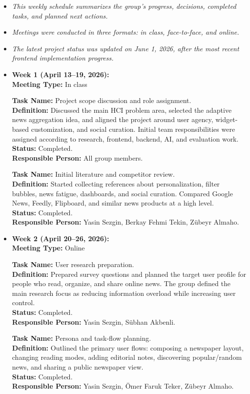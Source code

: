 \documentclass[12pt,a4paper]{article}
\newcommand{\taskentry}[4]{%
  \textbf{Task Name:} #1\\
  \textbf{Definition:} #2\\
  \textbf{Status:} #3\\
  \textbf{Responsible Person:} #4
}
\newcommand{\weekblock}[3]{%
  \item {\Large\bfseries #1}\\[-0.2em]
  \textbf{Meeting Type:} #2

  \vspace{0.25cm}
  \hspace*{0.8cm}
  \begin{minipage}[t]{0.86\textwidth}
    #3
  \end{minipage}
}
\begin{document}
\begin{itemize}[leftmargin=2.1cm, itemsep=0.4em]
    \item \textit{This weekly schedule summarizes the group's progress, decisions, completed tasks, and planned next actions.}
    \item \textit{Meetings were conducted in three formats: in class, face-to-face, and online.}
    \item \textit{The latest project status was updated on June 1, 2026, after the most recent frontend implementation progress.}
\end{itemize}

\vspace{0.4cm}

\begin{itemize}[leftmargin=1.1cm, itemsep=1.45cm]
    \weekblock{Week 1 (April 13--19, 2026):}{In class}{
      \taskentry
        {Project scope discussion and role assignment.}
        {Discussed the main HCI problem area, selected the adaptive news aggregation idea, and aligned the project around user agency, widget-based customization, and social curation. Initial team responsibilities were assigned according to research, frontend, backend, AI, and evaluation work.}
        {Completed.}
        {All group members.}

      \vspace{0.45cm}
      \taskentry
        {Initial literature and competitor review.}
        {Started collecting references about personalization, filter bubbles, news fatigue, dashboards, and social curation. Compared Google News, Feedly, Flipboard, and similar news products at a high level.}
        {Completed.}
        {Yasin Sezgin, Berkay Fehmi Tekin, Zübeyr Almaho.}
    }

    \weekblock{Week 2 (April 20--26, 2026):}{Online}{
      \taskentry
        {User research preparation.}
        {Prepared survey questions and planned the target user profile for people who read, organize, and share online news. The group defined the main research focus as reducing information overload while increasing user control.}
        {Completed.}
        {Yasin Sezgin, Sübhan Akbenli.}

      \vspace{0.45cm}
      \taskentry
        {Persona and task-flow planning.}
        {Outlined the primary user flows: composing a newspaper layout, changing reading modes, adding editorial notes, discovering popular/random news, and sharing a public newspaper view.}
        {Completed.}
        {Yasin Sezgin, Ömer Faruk Teker, Zübeyr Almaho.}
    }


\end{itemize}
\end{document}
